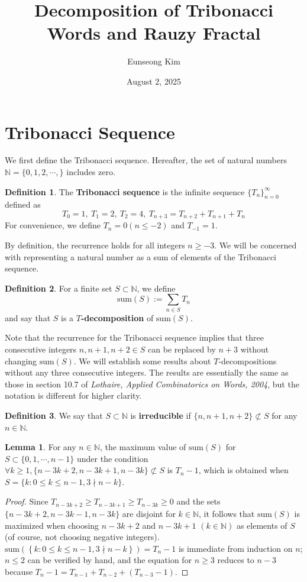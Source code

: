 \documentclass{article}
\title{\textbf{Decomposition of Tribonacci Words and Rauzy Fractal}}
\author{Eunseong Kim}
\date{August 2, 2025}
\theoremstyle{definition}
\newtheorem{lemma}[theorem]{Lemma}
\newtheorem*{definition}{Definition}
\begin{document}
\maketitle

\section{Tribonacci Sequence}

We first define the Tribonacci sequence. Hereafter, the set of natural numbers $\mathbb{N}=\{0,1,2,\cdots,\}$ includes zero.

\begin{definition}
The \textbf{Tribonacci sequence} is the infinite sequence $\{T_n \}_{n=0}^{\infty}$ defined as
\[T_0 = 1,\ T_1=2,\ T_2=4,\ T_{n+3}=T_{n+2}+T_{n+1}+T_n\]
For convenience, we define $T_{n}=0(n\leq -2)$ and $T_{-1}=1$.
\end{definition}

By definition, the recurrence holds for all integers $n\geq -3$. We will be concerned with representing a natural number as a sum of elements of the Tribonacci sequence.

\begin{definition} For a finite set $S\subset \mathbb{N}$, we define
\[\text{sum}(S):=\sum_{n\in S} T_n\]
and say that $S$ is a \textbf{$T$-decomposition} of $\text{sum}(S)$.
\end{definition}

Note that the recurrence for the Tribonacci sequence implies that three consecutive integers $n, n+1, n+2\in S$ can be replaced by $n+3$ without changing $\text{sum}(S)$. We will establish some results about $T$-decompositions without any three consecutive integers. The results are essentially the same as those in section 10.7 of \textit{Lothaire, Applied Combinatorics on Words, 2004}, but the notation is different for higher clarity.

\begin{definition}
We say that $S\subset \mathbb{N}$ is \textbf{irreducible} if $\{n,n+1,n+2\} \not\subset S$ for any $n\in \mathbb{N}$.
\end{definition}

\begin{lemma}
\label{lemma}
For any $n\in \mathbb{N}$, the maximum value of $\text{sum}(S)$ for $S\subset\{0,1,\cdots,n-1\}$ under the condition $\forall k\geq 1,  \{n-3k+2, n-3k+1, n-3k\}\not\subset S$ is $T_n-1$, which is obtained when $S=\{k: 0\leq k\leq n-1, 3\nmid n-k\}$.
\end{lemma}
\begin{proof}
Since
\(
  T_{n-3k+2} \geq T_{n-3k+1} \geq T_{n-3k}\geq0
\)
and the sets
\(
  \{n-3k+2, n-3k-1, n-3k\}
\)
are disjoint for \( k \in \mathbb{N} \), it follows that $\text{sum}(S)$ is maximized when choosing $n-3k+2$ and $n-3k+1$ $(k\in \mathbb{N})$ as elements of $S$ (of course, not choosing negative integers). $\text{sum} \left(\left\{k: 0\leq k\leq n-1, 3\nmid n-k \right\} \right)=T_n-1$ is immediate from induction on $n$; $n\leq2$ can be verified by hand, and the equation for $n\geq3$ reduces to $n-3$ because $T_n-1=T_{n-1}+T_{n-2}+\left(T_{n-3}-1 \right)$. 
\end{proof}
\end{document}
